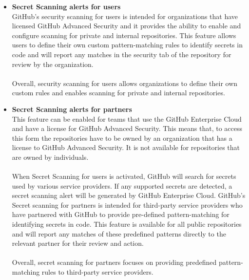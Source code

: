 \begin{itemize}
    \item \textbf{Secret Scanning alerts for users}\\
GitHub's security scanning for users is intended for organizations that have licensed GitHub Advanced Security and it provides the ability to enable and configure scanning for private and internal repositories. This feature allows users to define their own custom pattern-matching rules to identify secrets in code and will report any matches in the security tab of the repository for review by the organization. 
\\~\\
Overall, security scanning for users allows organizations to define their own custom rules and enables scanning for private and internal repositories.

\item \textbf{Secret Scanning alerts for partners}\\
This feature can be enabled for teams that use the GitHub Enterprise Cloud and have a license for GitHub Advanced Security. This means that, to access this form the repositories have to be owned by an organization that has a license to GitHub Advanced Security. It is not available for repositories that are owned by individuals. 
\\~\\
When Secret Scanning for users is activated, GitHub will search for secrets used by various service providers. If any supported secrets are detected, a secret scanning alert will be generated by GitHub Enterprise Cloud.
GitHub's Secret scanning for partners is intended for third-party service providers who have partnered with GitHub to provide pre-defined pattern-matching for identifying secrets in code. This feature is available for all public repositories and will report any matches of these predefined patterns directly to the relevant partner for their review and action. 
\\~\\
Overall, secret scanning for partners focuses on providing predefined pattern-matching rules to third-party service providers.


\end{itemize}
